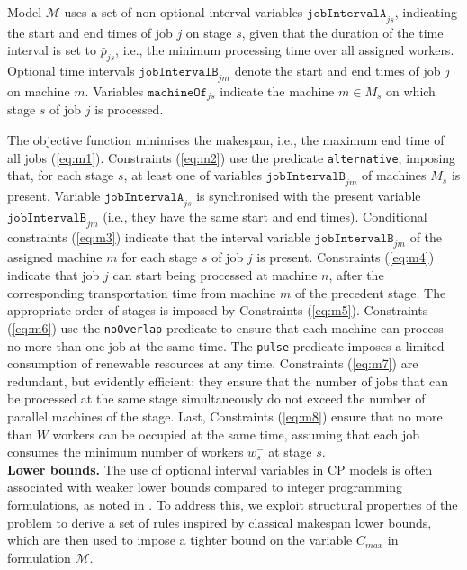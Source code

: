 \documentclass[a4paper,final]{article}
\begin{document}
Model $\mathcal{M}$ uses a set of non-optional interval variables $\texttt{jobIntervalA}_{js}$, indicating the start and end times of job $j$ on stage $s$, given that the duration of the time interval is set to $\bar{p}_{js}$, i.e., the minimum processing time over all assigned workers. Optional time intervals $\texttt{jobIntervalB}_{jm}$ denote the start and end times of job $j$ on machine $m$. Variables $\texttt{machineOf}_{js}$ indicate the machine $m\in M_{s}$ on which stage $s$ of job $j$ is processed.
        
The objective function minimises the makespan, i.e., the maximum end time of all jobs (\ref{eq:m1}). Constraints (\ref{eq:m2}) use the predicate \texttt{alternative}, imposing that, for each stage $s$, at least one of variables $\texttt{jobIntervalB}_{jm}$ of machines $M_{s}$ is present. Variable $\texttt{jobIntervalA}_{js}$ is synchronised with the present variable $\texttt{jobIntervalB}_{jm}$ (i.e., they have the same start and end times). Conditional constraints (\ref{eq:m3}) indicate that the interval variable $\texttt{jobIntervalB}_{jm}$ of the assigned machine $m$ for each stage $s$ of job $j$ is present. Constraints (\ref{eq:m4}) indicate that job $j$ can start being processed at machine $n$, after the corresponding transportation time from machine $m$ of the precedent stage. The appropriate order of stages is imposed by Constraints (\ref{eq:m5}). Constraints (\ref{eq:m6}) use the \texttt{noOverlap} predicate to ensure that each machine can process no more than one job at the same time. The \texttt{pulse} predicate imposes a limited consumption of renewable resources at any time. Constraints (\ref{eq:m7}) are redundant, but evidently efficient: they ensure that the number of jobs that can be processed at the same stage simultaneously do not exceed the number of parallel machines of the stage. Last, Constraints (\ref{eq:m8}) ensure that no more than $W$ workers can be occupied at the same time, assuming that each job consumes the minimum number of workers $w^{-}_{s}$ at stage $s$.\\

\noindent \textbf{Lower bounds. }The use of optional interval variables in CP models is often associated with weaker lower bounds compared to integer programming formulations, as noted in \cite{naderi2023mixed}. To address this, we exploit structural properties of the problem to derive a set of rules inspired by classical makespan lower bounds, which are then used to impose a tighter bound on the variable $C_{max}$ in formulation $\mathcal{M}$.
\end{document}
